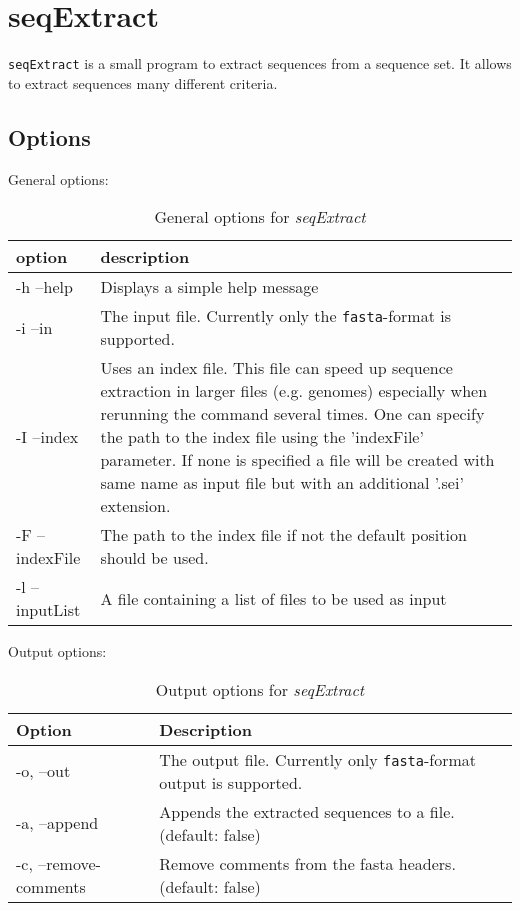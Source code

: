 \chapter{seqExtract}

\texttt{seqExtract} is a small program to extract sequences from a sequence set. It allows to extract sequences many different criteria.


\section{Options}
General options:

\begin{table}[H]
\caption{General options for \textit{seqExtract}}
\begin{tabular}{lp{12cm}}\hline
option & description\\
\hline
  -h --help & Displays a simple help message\\
  -i --in & The input file. Currently only the \texttt{fasta}-format is supported.\\
  -I --index &  Uses an index file. This file can speed up sequence extraction in larger files (e.g. genomes) especially when rerunning the command several times. One can specify the path to the index file using the 'indexFile' parameter. If none is specified a file will be created with same name as input file but with an additional '.sei' extension. \\
  -F --indexFile & The path to the index file if not the default position should be used.\\
  -l --inputList & A file containing a list of files to be used as input\\
  \hline
\end{tabular}
\end{table}






Output options:
\begin{table}[H]
\caption{Output options for \textit{seqExtract}}
\begin{tabular}{lp{10.5cm}}
\hline
Option & Description\\
\hline
  -o, --out & The output file. Currently only \texttt{fasta}-format output is supported.\\
  -a, --append &  Appends the extracted sequences to a file. (default: false)\\
  -c, --remove-comments &   Remove comments from the fasta headers. (default: false)\\
  \hline
\end{tabular}
\end{table}


